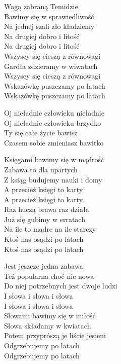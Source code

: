 \begin{text}
    Wagą zabraną Temidzie\\
    Bawimy się w sprawiedliwość\\
    Na jednej szali zło kładziemy\\
    Na drugiej dobro i litość\\
    Na drugiej dobro i litość\\
    Wszyscy się cieszą z równowagi\\
    Gardła zdzieramy w wiwatach\\
    Wszyscy się cieszą z równowagi\\
    Wskazówkę puszczamy po latach\\
    Wskazówkę puszczamy po latach

    Oj nieładnie człowieku nieładnie\\
    Oj nieładnie człowieku brzydko\\
    Ty się całe życie bawisz\\
    Czasem sobie zmieniasz bawitko

    Księgami bawimy się w mądrość\\
    Zabawa to dla upartych\\
    Z ksiąg budujemy nauki i domy\\
    A przecież księgi to karty\\
    A przecież księgi to karty\\
    Raz huczą brawa raz działa\\
    Już się gubimy w erratach\\
    Na ile to mądre na ile starczy\\
    Ktoś nas osądzi po latach\\
    Ktoś nas osądzi po latach

    Jest jeszcze jedna zabawa\\
    Też popularna choć nie nowa\\
    Do niej potrzebnych jest dwoje ludzi\\
    I słowa i słowa i słowa\\
    I słowa i słowa i słowa\\
    Słowami bawimy się w miłość\\
    Słowa składamy w kwiatach\\
    Potem przyprószą je liście jesieni\\
    Odgrzebujemy po latach\\
    Odgrzebujemy po latach
\end{text}
\begin{chord}

\end{chord}